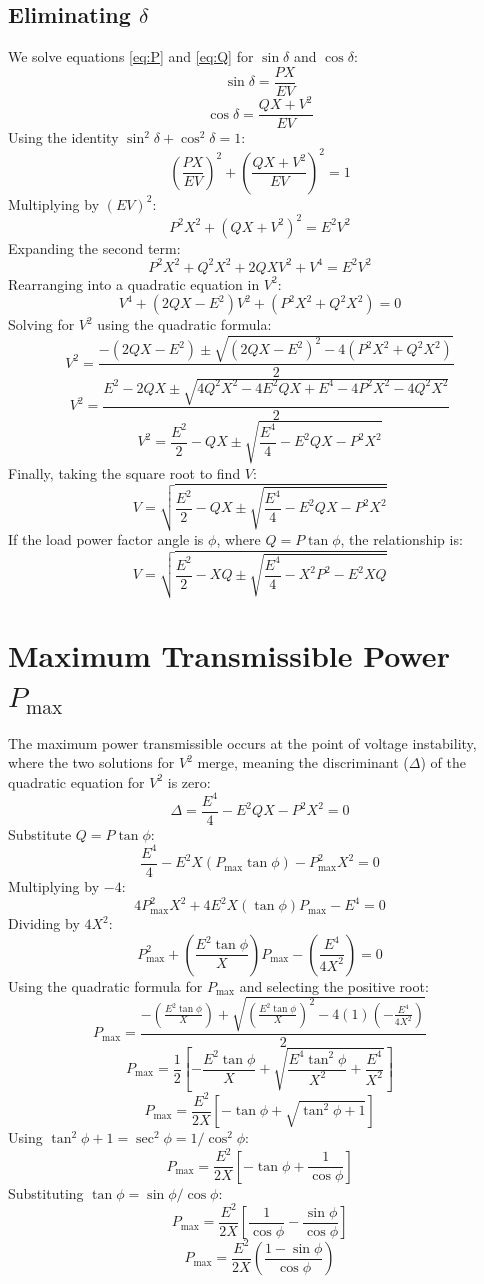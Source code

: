 \documentclass{article}
\begin{document}
\subsection*{Eliminating $\delta$}
We solve equations \ref{eq:P} and \ref{eq:Q} for $\sin\delta$ and $\cos\delta$:
$$\sin\delta = \frac{PX}{EV}$$
$$\cos\delta = \frac{QX + V^2}{EV}$$
Using the identity $\sin^2\delta + \cos^2\delta = 1$:
$$\left( \frac{PX}{EV} \right)^2 + \left( \frac{QX + V^2}{EV} \right)^2 = 1$$
Multiplying by $(EV)^2$:
$$P^2 X^2 + (Q X + V^2)^2 = E^2 V^2$$
Expanding the second term:
$$P^2 X^2 + Q^2 X^2 + 2 Q X V^2 + V^4 = E^2 V^2$$
Rearranging into a quadratic equation in $V^2$:
$$V^4 + (2 Q X - E^2) V^2 + (P^2 X^2 + Q^2 X^2) = 0$$
Solving for $V^2$ using the quadratic formula:
$$V^2 = \frac{-(2QX - E^2) \pm \sqrt{(2QX - E^2)^2 - 4(P^2 X^2 + Q^2 X^2)}}{2}$$
$$V^2 = \frac{E^2 - 2QX \pm \sqrt{4Q^2X^2 - 4E^2QX + E^4 - 4P^2 X^2 - 4Q^2 X^2}}{2}$$
$$V^2 = \frac{E^2}{2} - QX \pm \sqrt{\frac{E^4}{4} - E^2QX - P^2 X^2}$$
Finally, taking the square root to find $V$:
$$V = \sqrt{\frac{E^2}{2} - QX \pm \sqrt{\frac{E^4}{4} - E^2QX - P^2 X^2}}$$
If the load power factor angle is $\phi$, where $Q=P \tan\phi$, the relationship is:
$$V = \sqrt{\frac{E^{2}}{2} - XQ \pm \sqrt{\frac{E^{4}}{4} - X^{2}P^{2} - E^{2}XQ}}$$


\section{Maximum Transmissible Power $P_{\text{max}}$}
The maximum power transmissible occurs at the point of voltage instability, where the two solutions for $V^2$ merge, meaning the discriminant ($\Delta$) of the quadratic equation for $V^2$ is zero:
$$\Delta = \frac{E^4}{4} - E^2QX - P^2 X^2 = 0$$
Substitute $Q = P \tan\phi$:
$$\frac{E^4}{4} - E^2 X (P_{\text{max}} \tan\phi) - P_{\text{max}}^2 X^2 = 0$$
Multiplying by $-4$:
$$4 P_{\text{max}}^2 X^2 + 4 E^2 X (\tan\phi) P_{\text{max}} - E^4 = 0$$
Dividing by $4X^2$:
$$P_{\text{max}}^2 + \left( \frac{E^2 \tan\phi}{X} \right) P_{\text{max}} - \left( \frac{E^4}{4X^2} \right) = 0$$
Using the quadratic formula for $P_{\text{max}}$ and selecting the positive root:
$$P_{\text{max}} = \frac{-\left(\frac{E^2 \tan\phi}{X}\right) + \sqrt{\left(\frac{E^2 \tan\phi}{X}\right)^2 - 4(1)\left(-\frac{E^4}{4X^2}\right)}}{2}$$
$$P_{\text{max}} = \frac{1}{2} \left[ -\frac{E^2 \tan\phi}{X} + \sqrt{\frac{E^4 \tan^2\phi}{X^2} + \frac{E^4}{X^2}} \right]$$
$$P_{\text{max}} = \frac{E^2}{2X} \left[ -\tan\phi + \sqrt{\tan^2\phi + 1} \right]$$
Using $\tan^2\phi + 1 = \sec^2\phi = 1/\cos^2\phi$:
$$P_{\text{max}} = \frac{E^2}{2X} \left[ -\tan\phi + \frac{1}{\cos\phi} \right]$$
Substituting $\tan\phi = \sin\phi/\cos\phi$:
$$P_{\text{max}} = \frac{E^2}{2X} \left[ \frac{1}{\cos\phi} - \frac{\sin\phi}{\cos\phi} \right]$$
\begin{equation}
    P_{\text{max}} = \frac{E^{2}}{2X}\left(\frac{1 - \sin\phi}{\cos\phi}\right)
\end{equation}
\end{document}
